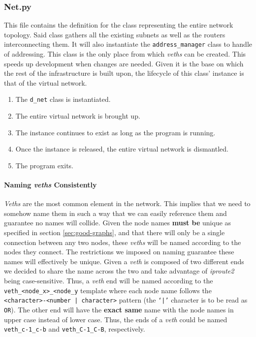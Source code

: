 \subsubsection{Net.py}
    This file contains the definition for the class representing the entire network topology. Said class gathers all the existing subnets as well as the routers interconnecting them. It will also instantiate the \texttt{address\_manager} class to handle of addressing. This class is the only place from which \textit{veths} can be created. This speeds up development when changes are needed. Given it is the base on which the rest of the infrastructure is built upon, the lifecycle of this class' instance is that of the virtual network.\\

    \begin{enumerate}
        \item The \texttt{d\_net} class is instantiated.
        \item The entire virtual network is brought up.
        \item The instance continues to exist as long as the program is running.
        \item Once the instance is released, the entire virtual network is dismantled.
        \item The program exits.
    \end{enumerate}

    \paragraph{Naming \textit{veths} Consistently}
        \textit{Veths} are the most common element in the network. This implies that we need to somehow name them in such a way that we can easily reference them and guarantee no names will collide. Given the node names \textbf{must be} unique as specified in section \ref{sec:good-graphs}, and that there will only be a single connection between any two nodes, these \textit{veths} will be named according to the nodes they connect. The restrictions we imposed on naming guarantee these names will effectively be unique. Given a \textit{veth} is composed of two different ends we decided to share the name across the two and take advantage of \textit{iproute2} being case-sensitive. Thus, a \textit{veth} end will be named according to the \texttt{veth\_<node\_x>\_<node\_y} template where each node name follows the \texttt{<character>-<number | character>} pattern (the \texttt{`|'} character is to be read as \texttt{OR}). The other end will have the \textbf{exact same} name with the node names in upper case instead of lower case. Thus, the ends of a \textit{veth} could be named \texttt{veth\_c-1\_c-b} and \texttt{veth\_C-1\_C-B}, respectively.

